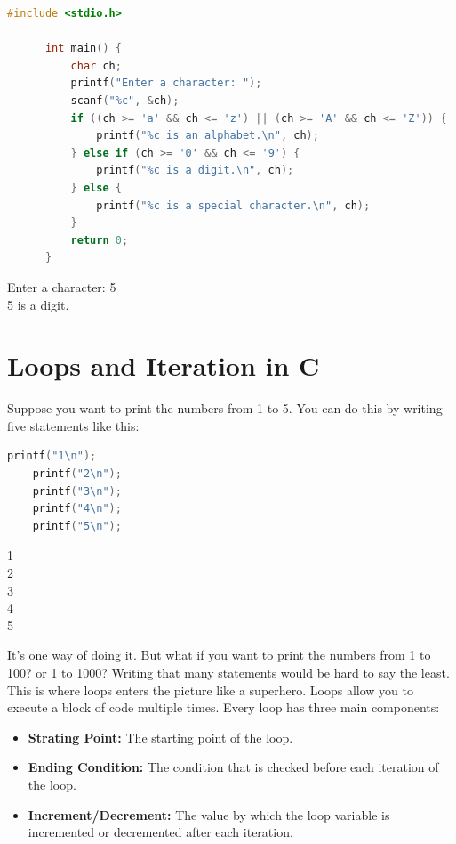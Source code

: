 \documentclass[12pt, openany]{book}
\begin{document}
  \begin{lstlisting}[language=C, caption=Solution to Exercise 6]
      #include <stdio.h>
      
      int main() {
          char ch;
          printf("Enter a character: ");
          scanf("%c", &ch);
          if ((ch >= 'a' && ch <= 'z') || (ch >= 'A' && ch <= 'Z')) {
              printf("%c is an alphabet.\n", ch);
          } else if (ch >= '0' && ch <= '9') {
              printf("%c is a digit.\n", ch);
          } else {
              printf("%c is a special character.\n", ch);
          }
          return 0;
      }
  \end{lstlisting}
  \begin{tcolorbox}[colback=lightgray!10, colframe=black, title=Output]
      Enter a character: 5 \\
      5 is a digit.
  \end{tcolorbox}

\chapter{Loops and Iteration in C}
Suppose you want to print the numbers from 1 to 5. You can do this by writing five  statements like this:
\vspace{10pt}
\begin{lstlisting}[language=C, gobble=0]
    printf("1\n");
    printf("2\n");
    printf("3\n");
    printf("4\n");
    printf("5\n");
\end{lstlisting}
\begin{tcolorbox}[colback=lightgray!10, colframe=black, title=Output]
    1 \\
    2 \\
    3 \\
    4 \\
    5
\end{tcolorbox}
\vspace{10pt}
It's one way of doing it. But what if you want to print the numbers from 1 to 100? or 1 to 1000? Writing that many  statements would be hard to say the least. This is where loops enters the picture like a superhero. Loops allow you to execute a block of code multiple times. Every loop has three main components:
\begin{itemize}
    \item \textbf{Strating Point:} The starting point of the loop.
    \item \textbf{Ending Condition:} The condition that is checked before each iteration of the loop.
    \item \textbf{Increment/Decrement:} The value by which the loop variable is incremented or decremented after each iteration.
\end{itemize}
\end{document}
